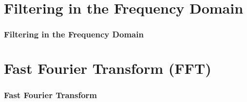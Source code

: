 
\section{Filtering in the Frequency Domain}


\begin{frame}
\frametitle{Filtering in the Frequency Domain}
\end{frame}


\section{Fast Fourier Transform (FFT)}


\begin{frame}
\frametitle{Fast Fourier Transform}
\end{frame}




